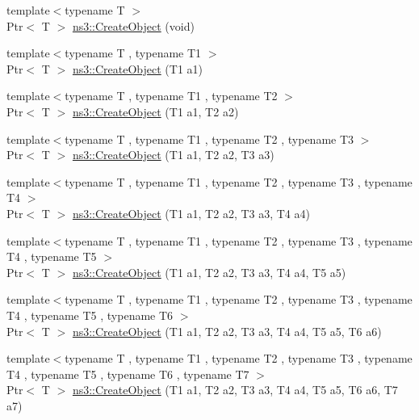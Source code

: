\begin{DoxyCompactItemize}
\item 
{\footnotesize template$<$typename T $>$ }\\Ptr$<$ T $>$ \hyperlink{group__object_gad1d36559be10afa72c3656fd8598c1e2}{ns3\+::\+Create\+Object} (void)
\item 
{\footnotesize template$<$typename T , typename T1 $>$ }\\Ptr$<$ T $>$ \hyperlink{group__object_ga4ad75fcdf08a71b1d0255340f2230663}{ns3\+::\+Create\+Object} (T1 a1)
\item 
{\footnotesize template$<$typename T , typename T1 , typename T2 $>$ }\\Ptr$<$ T $>$ \hyperlink{group__object_gae161c964f8bd87ecec04242378bd1576}{ns3\+::\+Create\+Object} (T1 a1, T2 a2)
\item 
{\footnotesize template$<$typename T , typename T1 , typename T2 , typename T3 $>$ }\\Ptr$<$ T $>$ \hyperlink{group__object_ga9dc6baf1e2fdd74f68689c23a436a6d9}{ns3\+::\+Create\+Object} (T1 a1, T2 a2, T3 a3)
\item 
{\footnotesize template$<$typename T , typename T1 , typename T2 , typename T3 , typename T4 $>$ }\\Ptr$<$ T $>$ \hyperlink{group__object_ga3fa42778a7848d8fbff683e388d00d9f}{ns3\+::\+Create\+Object} (T1 a1, T2 a2, T3 a3, T4 a4)
\item 
{\footnotesize template$<$typename T , typename T1 , typename T2 , typename T3 , typename T4 , typename T5 $>$ }\\Ptr$<$ T $>$ \hyperlink{group__object_ga0cbfd5b57da93b40e26e9d301e6efb45}{ns3\+::\+Create\+Object} (T1 a1, T2 a2, T3 a3, T4 a4, T5 a5)
\item 
{\footnotesize template$<$typename T , typename T1 , typename T2 , typename T3 , typename T4 , typename T5 , typename T6 $>$ }\\Ptr$<$ T $>$ \hyperlink{group__object_ga2d3aa70b4f5df9a22d52e1c6a800b538}{ns3\+::\+Create\+Object} (T1 a1, T2 a2, T3 a3, T4 a4, T5 a5, T6 a6)
\item 
{\footnotesize template$<$typename T , typename T1 , typename T2 , typename T3 , typename T4 , typename T5 , typename T6 , typename T7 $>$ }\\Ptr$<$ T $>$ \hyperlink{group__object_gabcc7a3fbb07de0550ea21aac73af9c9d}{ns3\+::\+Create\+Object} (T1 a1, T2 a2, T3 a3, T4 a4, T5 a5, T6 a6, T7 a7)
\end{DoxyCompactItemize}


